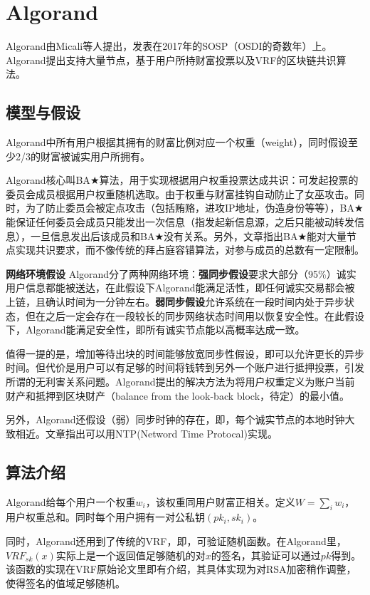 \section{Algorand}
Algorand由Micali等人提出，发表在2017年的SOSP（OSDI的奇数年）上\cite{gilad2017algorand}。Algorand提出支持大量节点，基于用户所持财富投票以及VRF的区块链共识算法。	
\subsection{模型与假设}
Algorand中所有用户根据其拥有的财富比例对应一个权重（weight），同时假设至少2/3的财富被诚实用户所拥有。	

Algorand核心叫BA$\bigstar$算法，用于实现根据用户权重投票达成共识：可发起投票的委员会成员根据用户权重随机选取。由于权重与财富挂钩自动防止了女巫攻击。同时，为了防止委员会被定点攻击（包括贿赂，进攻IP地址，伪造身份等等），BA$\bigstar$能保证任何委员会成员只能发出一次信息（指发起新信息源，之后只能被动转发信息），一旦信息发出后该成员和BA$\bigstar$没有关系。另外，文章指出BA$\bigstar$能对大量节点实现共识要求，而不像传统的拜占庭容错算法，对参与成员的总数有一定限制。

\textbf{网络环境假设}
Algorand分了两种网络环境：\textbf{强同步假设}要求大部分（95$\%$）诚实用户信息都能被送达，在此假设下Algorand能满足活性，即任何诚实交易都会被上链，且确认时间为一分钟左右。\textbf{弱同步假设}允许系统在一段时间内处于异步状态，但在之后一定会存在一段较长的同步网络状态时间用以恢复安全性。在此假设下，Algorand能满足安全性，即所有诚实节点能以高概率达成一致。

值得一提的是，增加等待出块的时间能够放宽同步性假设，即可以允许更长的异步时间。但代价是用户可以有足够的时间将钱转到另外一个账户进行抵押投票，引发所谓的无利害关系问题。Algorand提出的解决方法为将用户权重定义为账户当前财产和抵押到区块财产（balance from the look-back block，待定）的最小值。

另外，Algorand还假设（弱）同步时钟的存在，即，每个诚实节点的本地时钟大致相近。文章指出可以用NTP(Netword Time Protocal)实现。

\subsection{算法介绍}
Algorand给每个用户一个权重$w_i$，该权重同用户财富正相关。定义$W=\sum_i w_i$，用户权重总和。同时每个用户拥有一对公私钥$(pk_i,sk_i)$。

同时，Algorand还用到了传统的VRF，即，可验证随机函数。在Algorand里，$VRF_{sk}(x)$实际上是一个返回值足够随机的对$x$的签名，其验证可以通过$pk$得到。该函数的实现在VRF原始论文里即有介绍\cite{micali1999verifiable}，其具体实现为对RSA加密稍作调整，使得签名的值域足够随机。

